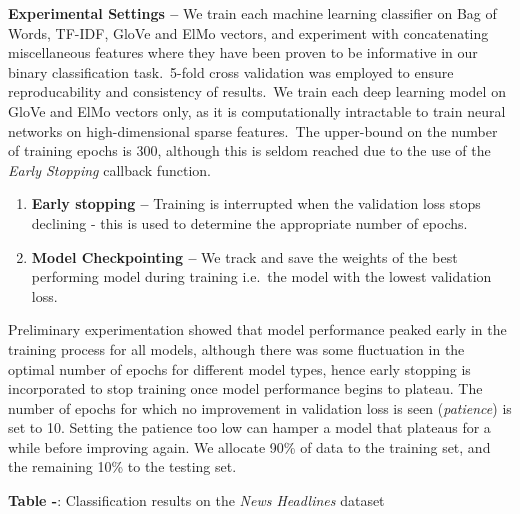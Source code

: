 \documentclass[12pt,a4paper]{article}
\begin{document}
\noindent \textbf{Experimental Settings --} We train each machine learning classifier on Bag of Words, TF-IDF, GloVe and ElMo vectors, and experiment with concatenating miscellaneous features where they have been proven to be informative in our binary classification task.\ 5-fold cross validation was employed to ensure reproducability and consistency of results.\ We train each deep learning model on GloVe and ElMo vectors only, as it is computationally intractable to train neural networks on high-dimensional sparse features.\ The upper-bound on the number of training epochs is 300, although this is seldom reached due to the use of the \textit{Early Stopping} callback function. \vspace{-5pt}

\begin{enumerate}
	\item \textbf{Early stopping --} Training is interrupted when the validation loss stops declining - this is used to determine the appropriate number of epochs.\vspace{-8pt}
	\item \textbf{Model Checkpointing --} We track and save the weights of the best performing model during training i.e.\ the model with the lowest validation loss.
\end{enumerate}\vspace{-5pt}

\noindent Preliminary experimentation showed that model performance peaked early in the training process for all models, although there was some fluctuation in the optimal number of epochs for different model types, hence early stopping is incorporated to stop training once model performance begins to plateau. The number of epochs for which no improvement in validation loss is seen (\textit{patience}) is set to 10. Setting the patience too low can hamper a model that plateaus for a while before improving again. We allocate 90\% of data to the training set, and the remaining 10\% to the testing set. \\





\begin{center}
	\textbf{Table -}: Classification results on the \textit{News Headlines} dataset
\end{center}
\end{document}
